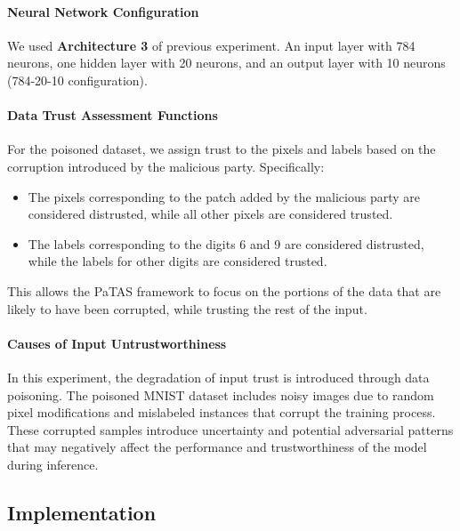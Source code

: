 \paragraph{Neural Network Configuration}
We used \textbf{Architecture 3} of previous experiment. An input layer with 784 neurons, one hidden layer with 20 neurons, and an output layer with 10 neurons (784-20-10 configuration).


\paragraph{Data Trust Assessment Functions}
For the poisoned dataset, we assign trust to the pixels and labels based on the corruption introduced by the malicious party. Specifically:
\begin{itemize}
    \item The pixels corresponding to the patch added by the malicious party are considered distrusted, while all other pixels are considered trusted.
    \item The labels corresponding to the digits 6 and 9 are considered distrusted, while the labels for other digits are considered trusted.
\end{itemize}
This allows the PaTAS framework to focus on the portions of the data that are likely to have been corrupted, while trusting the rest of the input.


\paragraph{Causes of Input Untrustworthiness}
In this experiment, the degradation of input trust is introduced through data poisoning. The poisoned MNIST dataset includes noisy images due to random pixel modifications and mislabeled instances that corrupt the training process. These corrupted samples introduce uncertainty and potential adversarial patterns that may negatively affect the performance and trustworthiness of the model during inference.

\subsection{Implementation}

